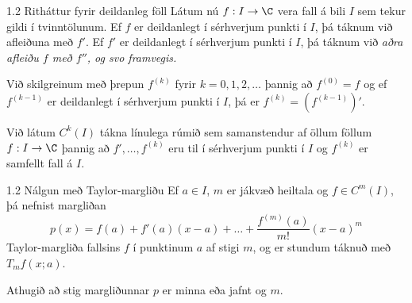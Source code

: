 \begin{frame}{1.2 Ritháttur fyrir deildanleg föll}
Látum nú $f : I \to \C$ vera fall á bili $I$ sem tekur gildi í
tvinntölunum. Ef $f$ er deildanlegt í sérhverjum punkti í $I$, þá
táknum við afleiðuna með $f'$. Ef $f'$ er deildanlegt í sérhverjum
punkti í $I$, þá táknum við \em aðra afleiðu \em $f$ með $f''$, og svo
framvegis. 

\pause
\smallskip
Við skilgreinum með þrepun $f^{(k)}$ fyrir $k = 0,1,2,
\ldots$ þannig að $f^{(0)} = f$ og ef $f^{(k-1)}$ er deildanlegt í
sérhverjum punkti í $I$, þá er $f^{(k)} = (f^{(k-1)})'$. 

\pause
\smallskip
Við látum
$C^{k}(I)$ tákna línulega rúmið sem samanstendur af öllum föllum $f :
I \to \C$ þannig að $f', \ldots, f^{(k)}$ eru til í sérhverjum punkti
í $I$ og $f^{(k)}$ er samfellt fall á $I$. 
\end{frame}
%
\begin{frame}{1.2 Nálgun með Taylor-margliðu} 
Ef $a \in I$, $m$ er jákvæð heiltala og $f \in C^{m}(I)$, 
þá nefnist margliðan 
\begin{equation*}
  p(x) = %
f(a) + f'(a)(x-a) + \ldots   + \frac{f^{(m)}(a)}{m!}(x-a)^m
\end{equation*}
Taylor-margliða fallsins $f$ í punktinum $a$ af stigi $m$, og er 
stundum táknuð með $T_m f(x;a)$.

\pause
Athugið að stig margliðunnar $p$ er minna eða jafnt og $m$. 

\end{frame}

